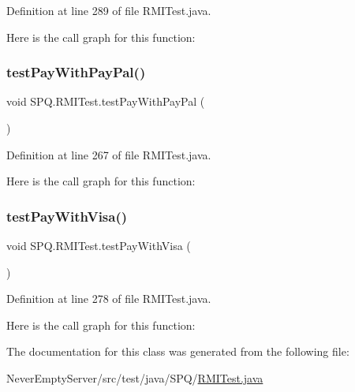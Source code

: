 Definition at line 289 of file R\+M\+I\+Test.\+java.

Here is the call graph for this function\+:
\mbox{\label{class_s_p_q_1_1_r_m_i_test_a15a72e3572c99f10ba0ac5b0368f1a02}} 
\subsubsection{\texorpdfstring{test\+Pay\+With\+Pay\+Pal()}{testPayWithPayPal()}}
{\footnotesize\ttfamily void S\+P\+Q.\+R\+M\+I\+Test.\+test\+Pay\+With\+Pay\+Pal (\begin{DoxyParamCaption}{ }\end{DoxyParamCaption})}



Definition at line 267 of file R\+M\+I\+Test.\+java.

Here is the call graph for this function\+:
\mbox{\label{class_s_p_q_1_1_r_m_i_test_afc93d812f0763a7bd63583e6a573f024}} 
\subsubsection{\texorpdfstring{test\+Pay\+With\+Visa()}{testPayWithVisa()}}
{\footnotesize\ttfamily void S\+P\+Q.\+R\+M\+I\+Test.\+test\+Pay\+With\+Visa (\begin{DoxyParamCaption}{ }\end{DoxyParamCaption})}



Definition at line 278 of file R\+M\+I\+Test.\+java.

Here is the call graph for this function\+:


The documentation for this class was generated from the following file\+:\begin{DoxyCompactItemize}
\item 
Never\+Empty\+Server/src/test/java/\+S\+P\+Q/\mbox{\hyperlink{_r_m_i_test_8java}{R\+M\+I\+Test.\+java}}\end{DoxyCompactItemize}
